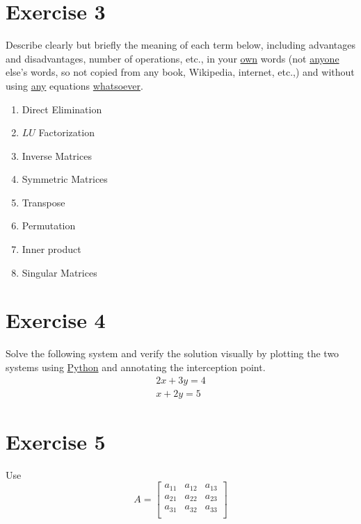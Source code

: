 \documentclass[12pt]{article}
\begin{document}
\section{Exercise 3}
Describe clearly but briefly the meaning of each term below, including
advantages and disadvantages, number of operations, etc.,  in your
\underline{own} words (not \underline{anyone} else's words, so not copied
from any book, Wikipedia, internet, etc.,) and without using
\underline{any} equations \underline{whatsoever}.

\begin{enumerate}[label=(\alph*)]
    \item Direct Elimination 
    \item $LU$ Factorization
    \item Inverse Matrices 
    \item Symmetric Matrices  
    \item Transpose
    \item Permutation 
    \item Inner product
    \item Singular Matrices
\end{enumerate}

\section{Exercise 4}
Solve the following system  and verify the solution visually by plotting
the two systems using \underline{Python} and annotating the interception
point. 
\begin{equation}
    \begin{aligned}
        2x  + 3y    = 4 \\
        x   + 2y    = 5 
    \end{aligned}
\end{equation}
\newpage
\section{Exercise 5}
Use
\begin{equation}
    A   = 
    \begin{bmatrix}
        a_{11}  &   a_{12}  &   a_{13}  \\
        a_{21}  &   a_{22}  &   a_{23}  \\
        a_{31}  &   a_{32}  &   a_{33}  \\
    \end{bmatrix}
\end{equation}
\end{document}
